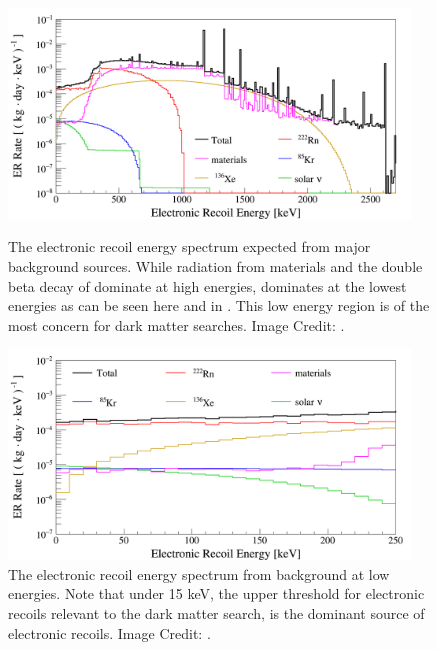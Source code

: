 

\begin{figure}[p]
	\centering
	\includegraphics[width=0.95\textwidth]{xe1t_all_energy_er_bkg}
	\caption{The electronic recoil energy spectrum expected from major background sources.  While radiation from materials and the double beta decay of  dominate at high energies,  dominates at the lowest energies as can be seen here and in .  This low energy region is of the most concern for dark matter searches.  Image Credit: .}
	\label{fig:xe1t_er_bkg_all}

        \vspace{\floatsep}

	\centering
	\includegraphics[width=0.95\textwidth]{xe1t_low_energy_er_bkg}
	\caption{The electronic recoil energy spectrum from background at low energies.  Note that under 15 keV, the upper threshold for electronic recoils relevant to the dark matter search, \radon{} is the dominant source of electronic recoils.  Image Credit: .}
	\label{fig:xe1t_er_bkg_low}
\end{figure}



